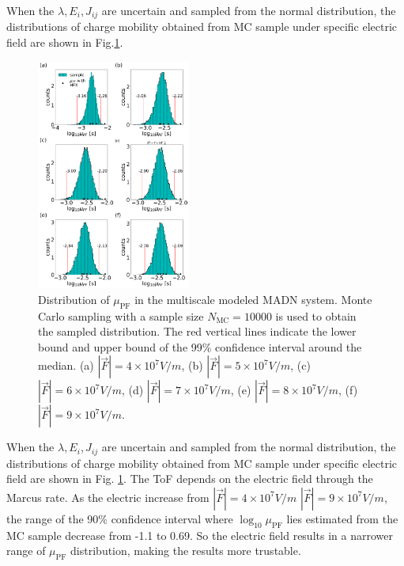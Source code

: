 \documentclass[%
 reprint,
superscriptaddress,
 amsmath,amssymb,
 aps,
prb,
floatfix
]{revtex4-2}
\begin{document}
When the $\lambda, E_i, J_{ij}$ are uncertain and sampled from the normal distribution, the distributions of charge mobility obtained from MC sample under specific electric field are shown in Fig.\ref{fig:fig_mle_withE_mu2_ave}.
%
\begin{figure}
    \centering
    \includegraphics[width=0.45\textwidth]{figs/fig_mle_withE_mu2_ave.pdf}
    \caption{Distribution of $\mu_\text{PF}$ in the multiscale modeled MADN system.
    Monte Carlo sampling with a sample size $N_\text{MC}=10000$ is used to obtain the sampled distribution. The red vertical lines indicate the lower bound and upper bound of the 99\% confidence interval around the median. (a) $|\vec{F}|=4 \times 10^7 \unit{V/m}$, (b) $|\vec{F}|=5 \times 10^7 \unit{V/m}$, (c) $|\vec{F}|=6 \times 10^7 \unit{V/m}$, (d) $|\vec{F}|=7 \times 10^7 \unit{V/m}$, (e) $|\vec{F}|=8 \times 10^7 \unit{V/m}$, (f) $|\vec{F}|=9 \times 10^7 \unit{V/m}$.}
    \label{fig:fig_mle_withE_mu2_ave}
\end{figure}
%

When the $\lambda, E_i, J_{ij}$ are uncertain and sampled from the normal distribution, the distributions of charge mobility obtained from MC sample under specific electric field are shown in Fig. \ref{fig:fig_mle_withE_mu2_ave}. The ToF depends on the electric field through the Marcus rate. As the electric increase from $|\vec{F}|=4 \times 10^7 \unit{V/m}$
$|\vec{F}|=9 \times 10^7 \unit{V/m}$, the
range of the 90\% confidence interval where $\log_{10} \mu_\text{PF}$ lies
estimated from the MC sample decrease from -1.1 to 0.69.
So the electric field results in a narrower range
of $\mu_\text{PF}$ distribution, making the results more trustable.
\end{document}
